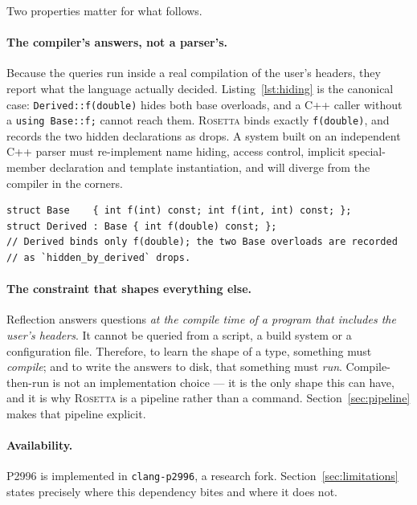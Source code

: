 \documentclass[11pt,a4paper]{article}
\newcommand{\rosetta}{\textsc{Rosetta}}
\newcommand{\code}[1]{\texttt{\small #1}}
\begin{document}
Two properties matter for what follows.

\paragraph{The compiler's answers, not a parser's.}
Because the queries run inside a real compilation of the user's headers, they
report what the language actually decided. Listing~\ref{lst:hiding} is the canonical
case: \code{Derived::f(double)} hides both base overloads, and a C++ caller
without a \code{using Base::f;} cannot reach them. \rosetta{} binds exactly
\code{f(double)}, and records the two hidden declarations as drops. A system
built on an independent C++ parser must re-implement name hiding, access
control, implicit special-member declaration and template instantiation, and
will diverge from the compiler in the corners.

\begin{lstlisting}[caption={Name hiding is a compiler decision, not a syntactic one.},label={lst:hiding}]
struct Base    { int f(int) const; int f(int, int) const; };
struct Derived : Base { int f(double) const; };
// Derived binds only f(double); the two Base overloads are recorded
// as `hidden_by_derived` drops.
\end{lstlisting}

\paragraph{The constraint that shapes everything else.}
Reflection answers questions \emph{at the compile time of a program that
includes the user's headers}. It cannot be queried from a script, a build system
or a configuration file. Therefore, to learn the shape of a type, something must
\emph{compile}; and to write the answers to disk, that something must
\emph{run}. Compile-then-run is not an implementation choice --- it is the only
shape this can have, and it is why \rosetta{} is a pipeline rather than a
command. Section~\ref{sec:pipeline} makes that pipeline explicit.

\paragraph{Availability.} P2996 is implemented in \code{clang-p2996}, a research
fork. Section~\ref{sec:limitations} states precisely where this dependency bites and
where it does not.

\end{document}
